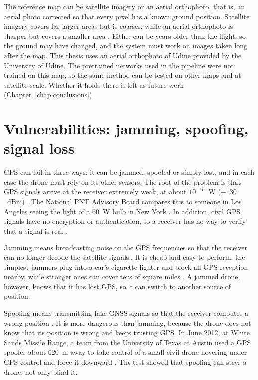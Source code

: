 \documentclass[english, Lau, oneside]{sapthesis}%
\begin{document}
The reference map can be satellite imagery or an aerial orthophoto, that is, an aerial photo corrected so that every pixel has a known ground position. Satellite imagery covers far larger areas but is coarser, while an aerial orthophoto is sharper but covers a smaller area \citep{couturier2024avl, durgam2024crossview}. Either can be years older than the flight, so the ground may have changed, and the system must work on images taken long after the map. This thesis uses an aerial orthophoto of Udine provided by the University of Udine. The pretrained networks used in the pipeline were not trained on this map, so the same method can be tested on other maps and at satellite scale. Whether it holds there is left as future work (Chapter~\ref{chap:conclusions}).

\section{Vulnerabilities: jamming, spoofing, signal loss}
\label{sec:intro-vulnerabilities}
GPS can fail in three ways: it can be jammed, spoofed or simply lost, and in each case the drone must rely on its other sensors. The root of the problem is that GPS signals arrive at the receiver extremely weak, at about $10^{-16}$~W ($-130$~dBm) \citep{pnt2010jamming, khan2021spoofing}. The National PNT Advisory Board compares this to someone in Los Angeles seeing the light of a 60~W bulb in New York \citep{pnt2010jamming}. In addition, civil GPS signals have no encryption or authentication, so a receiver has no way to verify that a signal is real \citep{khan2021spoofing}.

Jamming means broadcasting noise on the GPS frequencies so that the receiver can no longer decode the satellite signals \citep{couturier2024avl}. It is cheap and easy to perform: the simplest jammers plug into a car's cigarette lighter and block all GPS reception nearby, while stronger ones can cover tens of square miles \citep{pnt2010jamming}. A jammed drone, however, knows that it has lost GPS, so it can switch to another source of position.

Spoofing means transmitting fake GNSS signals so that the receiver computes a wrong position \citep{khan2021spoofing}. It is more dangerous than jamming, because the drone does not know that its position is wrong and keeps trusting GPS. In June 2012, at White Sands Missile Range, a team from the University of Texas at Austin used a GPS spoofer about 620~m away to take control of a small civil drone hovering under GPS control and force it downward \citep{kerns2014spoofing}. The test showed that spoofing can steer a drone, not only blind it.
\end{document}

